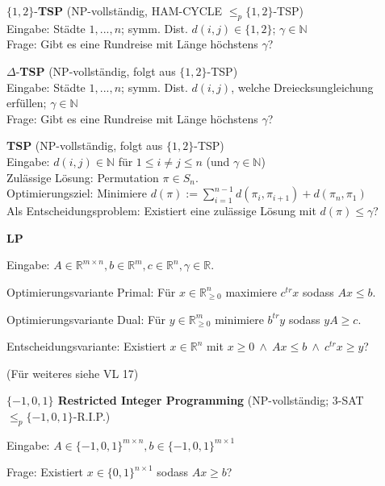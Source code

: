 \documentclass[a4paper,graphics,11pt]{article}
\begin{document}
\strut

$\{1,2\}$-\textbf{TSP} (\textsf{NP}-vollständig, HAM-CYCLE $\leq_p \{1,2\}$-TSP)
\\[5pt]
Eingabe: Städte $1,...,n$; symm. Dist. $d(i,j) \in \{1,2\}$; $\gamma \in \mathbb{N}$
\\[5pt]
Frage: Gibt es eine Rundreise mit Länge höchstens $\gamma$?

\strut

$\Delta$-\textbf{TSP} (\textsf{NP}-vollständig, folgt aus $\{1,2\}$-TSP)
\\[5pt]
Eingabe: Städte $1,...,n$; symm. Dist. $d(i,j)$, welche Dreiecksungleichung erfüllen; $\gamma \in \mathbb{N}$
\\[5pt]
Frage: Gibt es eine Rundreise mit Länge höchstens $\gamma$?

\newpage

\textbf{TSP} (\textsf{NP}-vollständig, folgt aus $\{1,2\}$-TSP)
\\[5pt]
Eingabe: $d(i,j) \in \mathbb{N}$ für $1 \leq i \neq j \leq n$ (und $\gamma \in \mathbb{N}$)
\\[5pt]
Zulässige Lösung: Permutation $\pi \in S_n$.
\\[5pt]
Optimierungsziel: Minimiere $\displaystyle d(\pi) := \sum_{i=1}^{n-1} d(\pi_i,\pi_{i+1}) + d(\pi_n, \pi_1)$ 
\\[5pt]
Als Entscheidungsproblem: Existiert eine zulässige Lösung mit $d(\pi) \leq \gamma$?

\strut

\textbf{LP}

Eingabe: $A \in \mathbb{R}^{m \times n}, b \in \mathbb{R}^m, c \in \mathbb{R}^n, \gamma \in \mathbb{R}$.

Optimierungsvariante Primal: Für $x \in \mathbb{R}^n_{\geq 0}$ maximiere $c^{tr}x$ sodass $Ax \leq b$.

Optimierungsvariante Dual: Für $y \in \mathbb{R}^m_{\geq 0}$ minimiere $b^{tr}y$ sodass $yA \geq c$.

Entscheidungsvariante: Existiert $x \in \mathbb{R}^n$ mit $x \geq 0\ \land\ Ax \leq b\ \land\ c^{tr}x \geq y$?

(Für weiteres siehe VL 17)

\strut

\textbf{$\{-1, 0, 1\}$ Restricted Integer Programming} (\textsf{NP}-vollständig; 3-SAT $\leq_p \{-1,0,1\}$-R.I.P.)

Eingabe: $A \in \{-1,0,1\}^{m \times n}, b \in \{-1,0,1\}^{m\times 1}$

Frage: Existiert $x \in \{0, 1\}^{n \times 1}$ sodass $Ax \geq b$?
\end{document}
